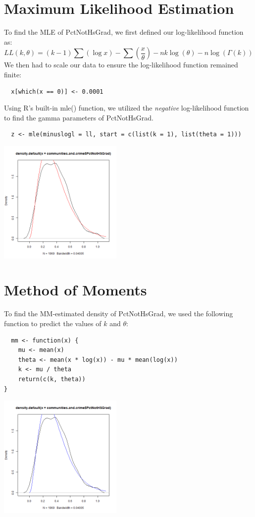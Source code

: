 \documentclass[12pt, letterpaper]{report}
\begin{document}
\pagebreak
\section{Maximum Likelihood Estimation}
To find the MLE of PctNotHsGrad, we first defined our log-likelihood function as:
\begin{equation}
  LL(k, \theta) = (k-1)\sum(\log{x}) - \sum(\frac{x}{\theta}) - n k \log{(\theta)} - n \log{(\Gamma(k))}
\end{equation}
We then had to scale our data to ensure the log-likelihood function remained finite: 
\begin{lstlisting}
  x[which(x == 0)] <- 0.0001  
\end{lstlisting} 

Using R's built-in mle() function, we utilized the \textit{negative} log-likelihood function to find the gamma parameters of PctNotHsGrad.
\begin{lstlisting}
  z <- mle(minuslogl = ll, start = c(list(k = 1), list(theta = 1)))
\end{lstlisting} 

\begin{center}
\includegraphics[width=0.45\textwidth]{gamma/PctNotHsGrad_mle}
\end{center}

\pagebreak
\section{Method of Moments}
To find the MM-estimated density of PctNotHsGrad, we used the following function to predict the values of $k$ and $\theta$:
\begin{lstlisting}
  mm <- function(x) {
    mu <- mean(x)
    theta <- mean(x * log(x)) - mu * mean(log(x))
    k <- mu / theta
    return(c(k, theta))
}
\end{lstlisting}

\begin{center}
\includegraphics[width=0.45\textwidth]{gamma/PctNotHsGrad_mm}
\end{center}
\end{document}
